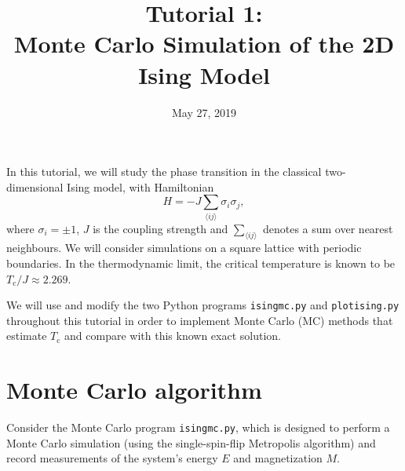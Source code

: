 \documentclass[letterpaper]{scrartcl}
\begin{document}

\title{Tutorial 1: \\ Monte Carlo Simulation of the 2D Ising Model}

\date{May 27, 2019}


\maketitle


In this tutorial, we will study the phase transition in the classical two-dimensional Ising model, with Hamiltonian
\begin{equation*}
H = -J \sum_{\langle ij \rangle} \sigma_i \sigma_j, 
\end{equation*}
where $\sigma_i = \pm 1$, $J$ is the coupling strength and $\sum_{\langle ij \rangle}$ denotes a sum over nearest neighbours.
We will consider simulations on a square lattice with periodic boundaries.
In the thermodynamic limit, the critical temperature is known to be ${ T_\text{c} }/{J} \approx 2.269$.

We will use and modify the two Python programs \texttt{ising{\textunderscore}mc.py} and \texttt{plot{\textunderscore}ising.py} throughout this tutorial 
in order to implement Monte Carlo (MC) methods that estimate $T_\text{c}$ and compare with this known exact solution.

\section{Monte Carlo algorithm}
Consider the Monte Carlo program \texttt{ising{\textunderscore}mc.py}, which is designed to perform a Monte Carlo simulation (using the single-spin-flip Metropolis algorithm) and record measurements of the system's energy $E$ and magnetization $M$. 
\end{document}

